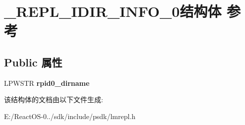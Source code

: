 \hypertarget{struct___r_e_p_l___i_d_i_r___i_n_f_o__0}{}\section{\+\_\+\+R\+E\+P\+L\+\_\+\+I\+D\+I\+R\+\_\+\+I\+N\+F\+O\+\_\+0结构体 参考}
\label{struct___r_e_p_l___i_d_i_r___i_n_f_o__0}
\subsection*{Public 属性}
\begin{DoxyCompactItemize}
\item 
\mbox{\label{struct___r_e_p_l___i_d_i_r___i_n_f_o__0_a480b864284f2009c371a9a11e025a5e8}} 
L\+P\+W\+S\+TR {\bfseries rpid0\+\_\+dirname}
\end{DoxyCompactItemize}


该结构体的文档由以下文件生成\+:\begin{DoxyCompactItemize}
\item 
E\+:/\+React\+O\+S-\/0../sdk/include/psdk/lmrepl.\+h\end{DoxyCompactItemize}
